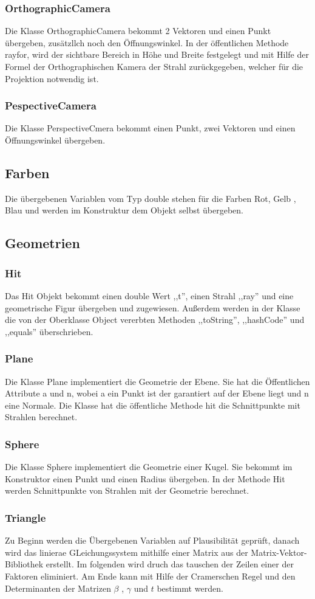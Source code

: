 \documentclass[14pt]{extarticle}
\begin{document}
\subsubsection{OrthographicCamera}
Die Klasse OrthographicCamera  bekommt 2 Vektoren und einen Punkt übergeben, zusätzllch noch den Öffnungswinkel. In der öffentlichen Methode rayfor, wird der sichtbare Bereich in Höhe und Breite festgelegt und mit Hilfe der Formel der Orthographischen Kamera der Strahl zurückgegeben, welcher für die Projektion notwendig ist.
\subsubsection{PespectiveCamera}
Die Klasse PerspectiveCmera bekommt einen Punkt, zwei Vektoren und einen Öffnungswinkel übergeben.  
\subsection{Farben}
Die übergebenen Variablen vom Typ double stehen für die Farben Rot, Gelb , Blau und werden im Konstruktur dem Objekt selbst übergeben.
\subsection{Geometrien}
\subsubsection{Hit}
Das Hit Objekt bekommt einen double Wert ,,t'', einen Strahl ,,ray'' und eine geometrische Figur übergeben und zugewiesen. Außerdem werden in der Klasse die von der Oberklasse Object vererbten Methoden ,,toString'', ,,hashCode'' und ,,equals'' überschrieben.
\subsubsection{Plane}
Die Klasse Plane implementiert die Geometrie der Ebene. Sie hat die Öffentlichen Attribute a und n, wobei a ein Punkt ist der garantiert auf der Ebene liegt und n eine Normale. Die Klasse hat die öffentliche Methode hit die Schnittpunkte mit Strahlen berechnet.
\subsubsection{Sphere}
Die Klasse Sphere implementiert die Geometrie einer Kugel. Sie bekommt im Konstruktor einen Punkt und einen Radius übergeben. In der Methode Hit werden Schnittpunkte von Strahlen mit der Geometrie berechnet.
\subsubsection{Triangle}
Zu Beginn werden die Übergebenen Variablen auf Plausibilität geprüft, danach wird das linierae GLeichungssystem mithilfe einer Matrix aus der Matrix-Vektor-Bibliothek erstellt. Im folgenden wird druch das tauschen der Zeilen einer der Faktoren eliminiert. Am Ende kann mit Hilfe der Cramerschen Regel und den Determinanten der Matrizen $\beta$ , $\gamma$ und $t$ bestimmt werden.
\end{document}
